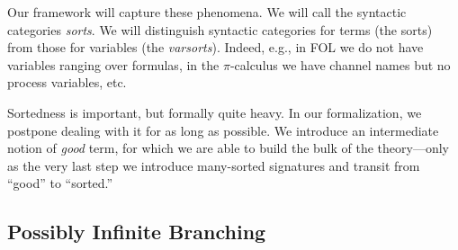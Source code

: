 \documentclass{llncs}
\begin{document}
Our framework will %
capture these phenomena. 
We will call the syntactic categories {\em sorts}. 
We will distinguish syntactic categories for terms (the sorts) from those for variables (the {\em varsorts}). 
Indeed, e.g., 
in FOL we do not have variables ranging over formulas,  
in the $\pi$-calculus \cite{MilPiBook} we have channel names %
but no process variables, etc.  

Sortedness is important, but formally quite heavy. 
In our formalization, we postpone dealing with 
it for as long as possible. 
We introduce an 
intermediate notion of {\em good} term, for which we are able to 
build the bulk of the theory---only as the very last step we introduce many-sorted signatures
and transit from ``good'' to ``sorted.''




\subsection{Possibly Infinite Branching} \label{prel-infBranch}
\end{document}
